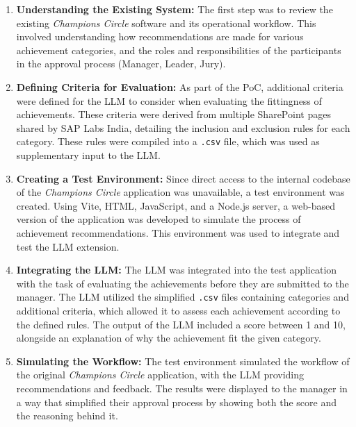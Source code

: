 \begin{enumerate}
    \item \textbf{Understanding the Existing System:} The first step was to review the existing \textit{Champions Circle} software and its operational workflow. 
    This involved understanding how recommendations are made for various achievement categories, 
    and the roles and responsibilities of the participants in the approval process (Manager, Leader, Jury).
    
    \item \textbf{Defining Criteria for Evaluation:} As part of the \ac{PoC}, additional criteria were defined for the \ac{LLM} to consider when evaluating the fittingness of achievements. 
    These criteria were derived from multiple SharePoint pages shared by SAP Labs India, detailing the inclusion and exclusion rules for each category. 
    These rules were compiled into a \texttt{.csv} file, which was used as supplementary input to the \ac{LLM}.
    
    \item \textbf{Creating a Test Environment:} Since direct access to the internal codebase of the \textit{Champions Circle} application was unavailable, a test environment was created. 
    Using Vite, HTML, JavaScript, and a Node.js server, a web-based version of the application was developed to simulate the process of achievement recommendations. 
    This environment was used to integrate and test the \ac{LLM} extension.
    
    \item \textbf{Integrating the \ac{LLM}:} The \ac{LLM} was integrated into the test application with the task of evaluating the achievements before they are submitted to the manager. 
    The \ac{LLM} utilized the simplified \texttt{.csv} files containing categories and additional criteria, which allowed it to assess each achievement according to the defined rules. 
    The output of the \ac{LLM} included a score between 1 and 10, alongside an explanation of why the achievement fit the given category.
    
    \item \textbf{Simulating the Workflow:} The test environment simulated the workflow of the original \textit{Champions Circle} application, 
    with the \ac{LLM} providing recommendations and feedback. 
    The results were displayed to the manager in a way that simplified their approval process by showing both the score and the reasoning behind it.
\end{enumerate}


